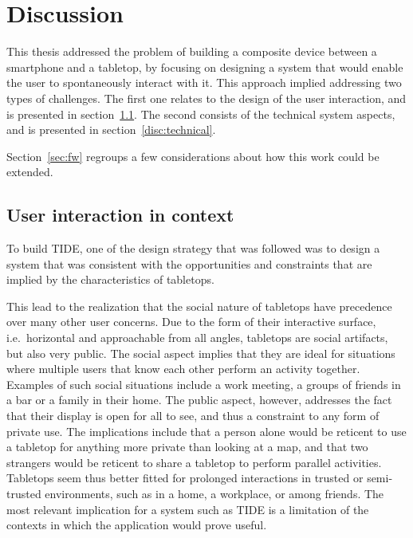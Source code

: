 \chapter{Discussion}
\label{discussion}

This thesis addressed the problem of building a composite device between a smartphone and a tabletop, by focusing on designing a system that would enable the user to spontaneously interact with it.
This approach implied addressing two types of challenges.
The first one relates to the design of the user interaction, and is presented in section~\ref{disc:ui}.
The second consists of the technical system aspects, and is presented in section~\ref{disc:technical}.

Section~\ref{sec:fw} regroups a few considerations about how this work could be extended.

\section{User interaction in context}
\label{disc:ui}

To build TIDE, one of the design strategy that was followed was to design a system that was consistent with the opportunities and constraints that are implied by the characteristics of tabletops.

This lead to the realization that the social nature of tabletops have precedence over many other user concerns.
Due to the form of their interactive surface, i.e.\ horizontal and approachable from all angles, tabletops are social artifacts,  but also very public.
The social aspect implies that they are ideal for situations where multiple users that know each other perform an activity together.
Examples of such social situations include a work meeting, a groups of friends in a bar or a family in their home.
The public aspect, however, addresses the fact that their display is open for all to see, and thus a constraint to any form of private use.
The implications include that a person alone would be reticent to use a tabletop for anything more private than looking at a map, and that two strangers would be reticent to share a tabletop to perform parallel activities.
Tabletops seem thus better fitted for prolonged interactions in trusted or semi-trusted environments, such as in a home, a workplace, or among friends.
The most relevant implication for a system such as TIDE is a limitation of the contexts in which the application would prove useful.

